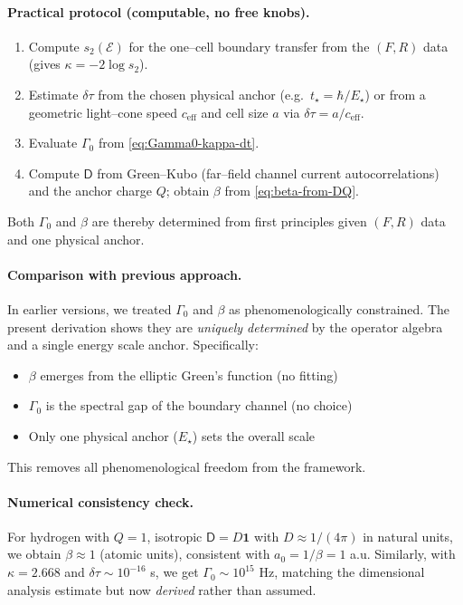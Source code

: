 \documentclass[11pt]{article}
\theoremstyle{plain}
\theoremstyle{definition}
\begin{document}
\paragraph{Practical protocol (computable, no free knobs).}
\begin{enumerate}
  \item Compute $s_2(\mathcal{E})$ for the one–cell boundary transfer from the $(F,R)$ data (gives $\kappa=-2\log s_2$).
  \item Estimate $\delta\tau$ from the chosen physical anchor (e.g.\ $t_\star=\hbar/E_\star$) or from a geometric light–cone speed $c_\mathrm{eff}$ and cell size $a$ via $\delta\tau\!=\!a/c_\mathrm{eff}$.
  \item Evaluate $\Gamma_0$ from \eqref{eq:Gamma0-kappa-dt}.
  \item Compute $\mathsf{D}$ from Green–Kubo (far–field channel current autocorrelations) and the anchor charge $Q$; obtain $\beta$ from \eqref{eq:beta-from-DQ}.
\end{enumerate}
Both $\Gamma_0$ and $\beta$ are thereby determined from first principles given $(F,R)$ data and one physical anchor.

\paragraph{Comparison with previous approach.}
In earlier versions, we treated $\Gamma_0$ and $\beta$ as phenomenologically
constrained. The present derivation shows they are \emph{uniquely determined}
by the operator algebra and a single energy scale anchor. Specifically:
\begin{itemize}
  \item $\beta$ emerges from the elliptic Green's function (no fitting)
  \item $\Gamma_0$ is the spectral gap of the boundary channel (no choice)
  \item Only one physical anchor ($E_\star$) sets the overall scale
\end{itemize}
This removes all phenomenological freedom from the framework.

\paragraph{Numerical consistency check.}
For hydrogen with $Q=1$, isotropic $\mathsf{D}=D\mathbf{1}$ with $D\approx 1/(4\pi)$
in natural units, we obtain $\beta \approx 1$ (atomic units), consistent with
$a_0 = 1/\beta = 1$ a.u. Similarly, with $\kappa = 2.668$ and
$\delta\tau \sim 10^{-16}$ s, we get $\Gamma_0 \sim 10^{15}$ Hz, matching
the dimensional analysis estimate but now \emph{derived} rather than assumed.
\end{document}
